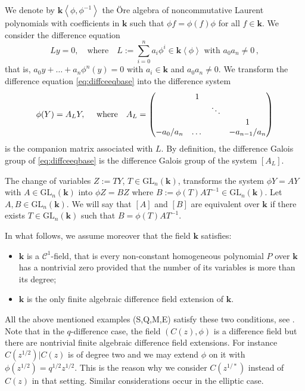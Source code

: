 \documentclass[a4paper,11pt]{amsart}
\newcommand{\GL}{\operatorname{GL}}
\def\k{\mathbf{k}}
\def\GL{\mathrm{GL}}
\begin{document}
We denote by $\k\left< \phi,\phi^{-1}\right> $ the \"Ore algebra of noncommutative Laurent polynomials with coefficients in $\k$ such that $\phi f = \phi(f)\phi$ for all $f\in\k$.
We consider the difference equation 
\begin{equation}\label{eq:diffceeqbase}
Ly=0,\quad  \text{where}\quad  L:=\sum_{i=0}^{n}  a_i \phi^{i} \in \k\left< \phi\right> \text{ with } a_0 a_n \neq 0 \, ,
\end{equation}
that is, 
$a_0 y+\dots +a_n \phi^n (y)=0$ with $a_i\in \k$ and $a_0 a_n \neq 0 $.
We transform the difference equation \eqref{eq:diffceeqbase}
into the difference system 
$$\phi(Y)=A_L Y,  \quad\hbox{ where} \quad A_L=\begin{pmatrix}
&1&&\\ 
 &  &\ddots & \\
&&&1\\
-a_0/a_n& \dots&&-a_{n-1}/a_n
\end{pmatrix} $$
is the companion matrix associated with $L$.
By definition, the difference Galois group of \eqref{eq:diffceeqbase} is the difference Galois group of the system $[A_L]$.\par 

The change of variables $Z:=TY$,  $T\in \GL_{n}(\k)$, transforms the system  $\phi Y=AY$ with  $A\in  \GL_{n}(\k)$ into $\phi Z=BZ$ where $B:=\phi(T)AT^{-1}\in  \GL_{n}(\k)$.  Let  $A,B\in  \GL_{n}(\k)$.  We will say that $[A]$ and $[B]$ are equivalent over $\k$ if there exists   $T\in \GL_{n}(\k)$ such that $B=\phi(T)AT^{-1}$. \par 

In what follows, we assume moreover that the field $\k$ satisfies:
\begin{itemize}
    \item $\k$ is a $\mathcal{C}^{1}$-field, that is every non-constant homogeneous polynomial $P$ over $\k$ has a nontrivial zero provided that the number of its variables is more than its degree;
    \item $\k$ is the only finite algebraic difference field extension of $\k$.
\end{itemize}
All the above mentioned examples (S,Q,M,E) satisfy these two conditions, see \cite{hendriks1997algorithm,hendriks1998algorithm,dreyfus2015galois,roques2018algebraic}. 
Note that in the $q$-difference case, the field $(C(z),\phi)$ is a difference field but there are nontrivial finite  algebraic difference field extensions. For instance $C(z^{1/2})|C(z)$ is of degree two and we may extend $\phi$ on it with $\phi (z^{1/2})=q^{1/2}z^{1/2}$. This is the reason why we consider $C(z^{1/*})$ instead of $C(z)$ in that setting. Similar considerations occur in the elliptic case.
\end{document}
